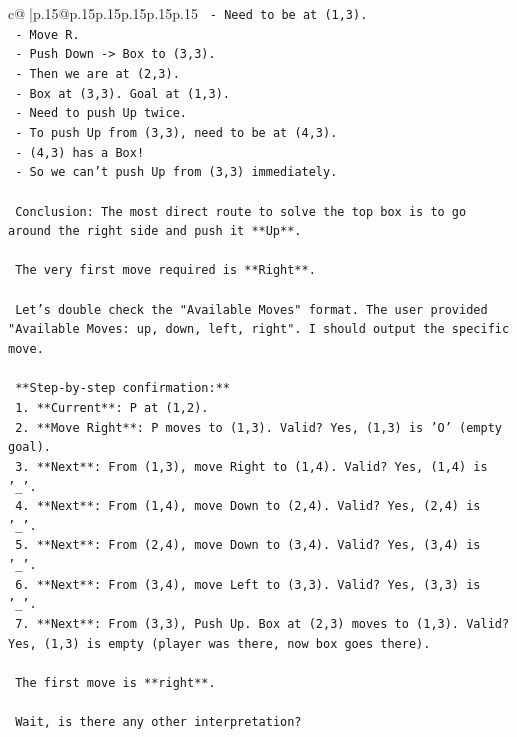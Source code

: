 \documentclass{article}
\begin{document}
{\begin{supertabular}{c@{$\;$}|p{.15\linewidth}@{}p{.15\linewidth}p{.15\linewidth}p{.15\linewidth}p{.15\linewidth}p{.15\linewidth}}
{{{\texttt{   {-} Need to be at (1,3).} \\
\texttt{   {-} Move R.} \\
\texttt{   {-} Push Down {-}> Box to (3,3).} \\
\texttt{   {-} Then we are at (2,3).} \\
\texttt{   {-} Box at (3,3). Goal at (1,3).} \\
\texttt{   {-} Need to push Up twice.} \\
\texttt{   {-} To push Up from (3,3), need to be at (4,3).} \\
\texttt{   {-} (4,3) has a Box!} \\
\texttt{   {-} So we can't push Up from (3,3) immediately.} \\
\\ 
\texttt{   Conclusion: The most direct route to solve the top box is to go around the right side and push it **Up**.} \\
\\ 
\texttt{   The very first move required is **Right**.} \\
\\ 
\texttt{   Let's double check the "Available Moves" format. The user provided "Available Moves: up, down, left, right". I should output the specific move.} \\
\\ 
\texttt{   **Step{-}by{-}step confirmation:**} \\
\texttt{   1. **Current**: P at (1,2).} \\
\texttt{   2. **Move Right**: P moves to (1,3). Valid? Yes, (1,3) is 'O' (empty goal).} \\
\texttt{   3. **Next**: From (1,3), move Right to (1,4). Valid? Yes, (1,4) is '\_'.} \\
\texttt{   4. **Next**: From (1,4), move Down to (2,4). Valid? Yes, (2,4) is '\_'.} \\
\texttt{   5. **Next**: From (2,4), move Down to (3,4). Valid? Yes, (3,4) is '\_'.} \\
\texttt{   6. **Next**: From (3,4), move Left to (3,3). Valid? Yes, (3,3) is '\_'.} \\
\texttt{   7. **Next**: From (3,3), Push Up. Box at (2,3) moves to (1,3). Valid? Yes, (1,3) is empty (player was there, now box goes there).} \\
\\ 
\texttt{   The first move is **right**.} \\
\\ 
\texttt{   Wait, is there any other interpretation?} \\
}}}
\end{supertabular}}
\end{document}
